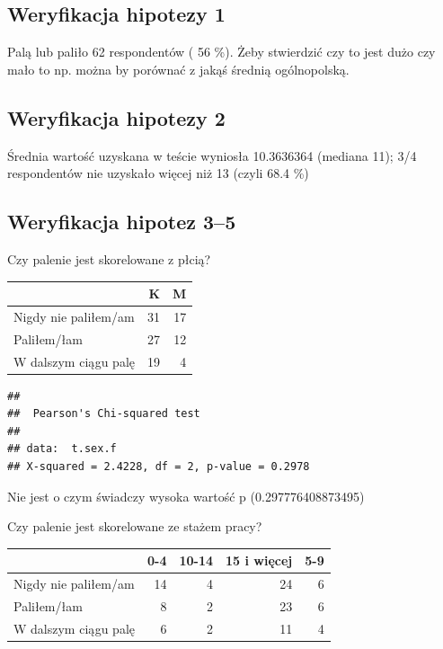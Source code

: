 \documentclass[
  openany]{book}
\begin{document}
\hypertarget{weryfikacja-hipotezy-1}{%
\subsection{Weryfikacja hipotezy 1}\label{weryfikacja-hipotezy-1}}

Palą lub paliło 62 respondentów
( 56 \%).
Żeby stwierdzić czy to jest dużo czy mało to np. można by porównać
z jakąś średnią ogólnopolską.

\hypertarget{weryfikacja-hipotezy-2}{%
\subsection{Weryfikacja hipotezy 2}\label{weryfikacja-hipotezy-2}}

Średnia wartość uzyskana w teście wyniosła 10.3636364
(mediana 11); 3/4 respondentów nie uzyskało więcej niż
13 (czyli 68.4 \%)

\hypertarget{weryfikacja-hipotez-35}{%
\subsection{Weryfikacja hipotez 3--5}\label{weryfikacja-hipotez-35}}

Czy palenie jest skorelowane z płcią?

\begin{tabular}{l|r|r}
\hline
  & K & M\\
\hline
Nigdy nie paliłem/am & 31 & 17\\
\hline
Paliłem/łam & 27 & 12\\
\hline
W dalszym ciągu palę & 19 & 4\\
\hline
\end{tabular}

\begin{verbatim}
## 
##  Pearson's Chi-squared test
## 
## data:  t.sex.f
## X-squared = 2.4228, df = 2, p-value = 0.2978
\end{verbatim}

Nie jest o czym świadczy wysoka wartość p (0.297776408873495)

Czy palenie jest skorelowane ze stażem pracy?

\begin{tabular}{l|r|r|r|r}
\hline
  & 0-4 & 10-14 & 15 i więcej & 5-9\\
\hline
Nigdy nie paliłem/am & 14 & 4 & 24 & 6\\
\hline
Paliłem/łam & 8 & 2 & 23 & 6\\
\hline
W dalszym ciągu palę & 6 & 2 & 11 & 4\\
\hline
\end{tabular}
\end{document}
